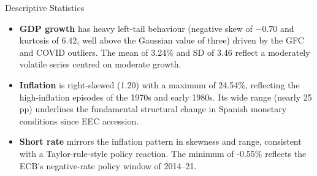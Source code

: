 \documentclass[9pt]{beamer}
\begin{document}
\begin{frame}{Descriptive Statistics}
\label{slide:descriptive}

{\footnotesize
\setlength{\tabcolsep}{4pt}

}

{\footnotesize
\begin{itemize}
    \item \textbf{GDP growth} has heavy left-tail behaviour (negative skew of $-0.70$ and kurtosis of $6.42$, well above the Gaussian value of three) driven by the GFC and COVID outliers. The mean of 3.24\% and SD of 3.46 reflect a moderately volatile series centred on moderate growth.

    \item \textbf{Inflation} is right-skewed (1.20) with a maximum of 24.54\%, reflecting the high-inflation episodes of the 1970s and early 1980s. Its wide range (nearly 25 pp) underlines the fundamental structural change in Spanish monetary conditions since EEC accession.

    \item \textbf{Short rate} mirrors the inflation pattern in skewness and range, consistent with a Taylor-rule-style policy reaction. The minimum of -0.55\% reflects the ECB's negative-rate policy window of 2014--21.
\end{itemize}
}

\end{frame}
\end{document}
